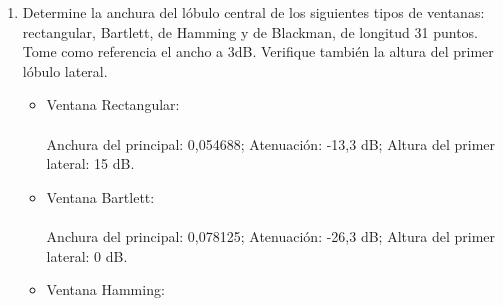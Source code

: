 \documentclass[a4paper,12pt]{article}
\begin{document}
\begin{enumerate}
\item Determine la anchura del lóbulo central de los siguientes tipos de ventanas: rectangular, Bartlett, de Hamming y de Blackman, de longitud 31 puntos. Tome como referencia el ancho a 3dB. Verifique también la altura del primer lóbulo lateral. \\
\begin{itemize}
\item Ventana Rectangular:\\
\\
Anchura del principal: 0,054688; Atenuación: -13,3 dB; Altura del primer lateral: 15 dB.
\item Ventana Bartlett:\\
\\
Anchura del principal: 0,078125; Atenuación: -26,3 dB; Altura del primer lateral: 0 dB.
\item Ventana Hamming:\\
\end{itemize}
\end{enumerate}
\end{document}
